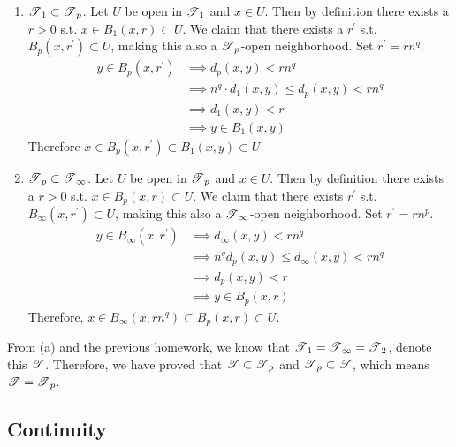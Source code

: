 \begin{solution}[Munkres 20.1.b]
    \begin{enumerate} 
      \item $\operatorname{\mathscr{T}}_1 \subset \operatorname{\mathscr{T}}_p$. Let $U$ be open in $\operatorname{\mathscr{T}}_1$ and $x \in U$. Then by definition there exists a $r > 0$ s.t. $x \in B_1 (x, r) \subset U$. We claim that there exists a $r^\prime$ s.t. $B_p (x, r^\prime) \subset U$, making this also a $\operatorname{\mathscr{T}}_p$-open neighborhood. Set $r^\prime = r n^q$. 
      \begin{align}
        y \in B_p (x, r^\prime) & \implies d_p (x, y) < r n^q \\
                                & \implies n^q \cdot d_1 (x, y) \leq d_p (x, y) < r n^q \\
                                & \implies d_1 (x, y) < r \\
                                & \implies y \in B_1 (x, y)
      \end{align}
      Therefore $x \in B_p (x, r^\prime) \subset B_1 (x, y) \subset U$. 

      \item $\operatorname{\mathscr{T}}_p \subset \operatorname{\mathscr{T}}_\infty$. Let $U$ be open in $\operatorname{\mathscr{T}}_p$ and $x \in U$. Then by definition there exists a $r > 0$ s.t. $x \in B_p (x, r) \subset U$. We claim that there exists $r^\prime$ s.t. $B_\infty (x, r^\prime) \subset U$, making this also a $\operatorname{\mathscr{T}}_\infty$-open neighborhood. Set $r^\prime = r n^p$. 
      \begin{align}
        y \in B_\infty (x, r^\prime) & \implies d_\infty (x, y) < r n^q \\
                                     & \implies n^q d_p (x, y) \leq d_\infty (x, y) < r n^q  \\
                                     & \implies d_p (x, y) < r \\
                                     & \implies y \in B_p (x, r)
      \end{align}
      Therefore, $x \in B_\infty (x, r n^q) \subset B_p (x, r) \subset U$. 
    \end{enumerate} 

    From (a) and the previous homework, we know that $\operatorname{\mathscr{T}}_1 = \operatorname{\mathscr{T}}_\infty = \operatorname{\mathscr{T}}_2$, denote this $\operatorname{\mathscr{T}}$. Therefore, we have proved that $\operatorname{\mathscr{T}} \subset \operatorname{\mathscr{T}}_p$ and $\operatorname{\mathscr{T}}_p \subset \operatorname{\mathscr{T}}$, which means $\operatorname{\mathscr{T}} = \operatorname{\mathscr{T}}_p$. 
  \end{solution}

\subsection{Continuity}

